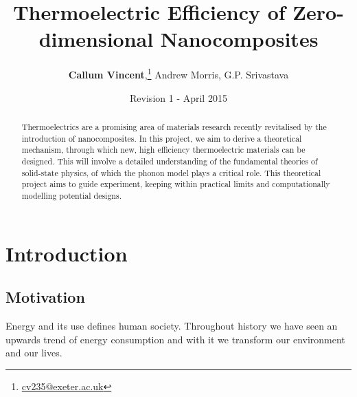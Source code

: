 \documentclass[12pt,draft]{article}
\begin{document}

\pagestyle{empty}

\title{\textbf{Thermoelectric Efficiency of Zero-dimensional Nanocomposites}}
\author{\textbf{Callum Vincent},\thanks{\href{mailto:cv235@exeter.ac.uk}{cv235@exeter.ac.uk}}
Andrew Morris,
G.P. Srivastava}
\date{Revision 1 - April 2015}
\maketitle

\begin{abstract}
\noindent
Thermoelectrics are a promising area of materials research recently revitalised by the introduction of nanocomposites. In this project, we aim to derive a theoretical mechanism, through which new, high efficiency thermoelectric materials can be designed. This will involve a detailed understanding of the fundamental theories of solid-state physics, of which the phonon model plays a critical role. This theoretical project aims to guide experiment, keeping within practical limits and computationally modelling potential designs.
\vfill
\end{abstract}
\thispagestyle{empty}
\pagebreak

\tableofcontents

\pagebreak


\pagestyle{fancy}

\section{Introduction}
 
\subsection{Motivation}
Energy and its use defines human society. Throughout history we have seen an upwards trend of energy consumption and with it we transform our environment and our lives.
\end{document}
